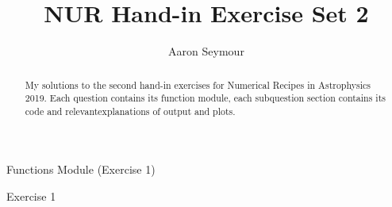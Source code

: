 \documentclass[a4paper,10pt]{article}
\title{NUR Hand-in Exercise Set 2}
\author{Aaron Seymour}
\begin{document}
\maketitle

\begin{abstract}
 My solutions to the second hand-in exercises for Numerical Recipes in Astrophysics 2019. Each question contains its function module, each subquestion section contains its code and relevantexplanations of output and plots.
\end{abstract}


\begin{section}{Functions Module (Exercise 1)}

\end{section}


\begin{section}{Exercise 1}

\end{section}


%

%
  

%

%
\end{document}
